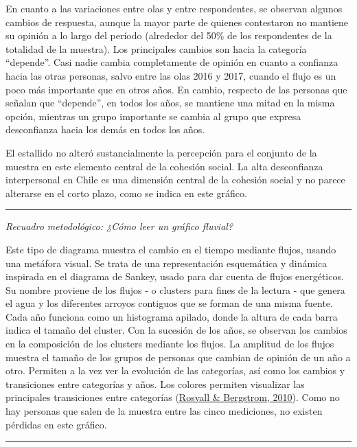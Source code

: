 \documentclass[
  12pt,
]{book}
\begin{document}
En cuanto a las variaciones entre olas y entre respondentes, se observan algunos cambios de respuesta, aunque la mayor parte de quienes contestaron no mantiene su opinión a lo largo del período (alrededor del 50\% de los respondentes de la totalidad de la muestra). Los principales cambios son hacia la categoría ``depende''. Casi nadie cambia completamente de opinión en cuanto a confianza hacia las otras personas, salvo entre las olas 2016 y 2017, cuando el flujo es un poco más importante que en otros años. En cambio, respecto de las personas que señalan que ``depende'', en todos los años, se mantiene una mitad en la misma opción, mientras un grupo importante se cambia al grupo que expresa desconfianza hacia los demás en todos los años.

El estallido no alteró sustancialmente la percepción para el conjunto de la muestra en este elemento central de la cohesión social. La alta desconfianza interpersonal en Chile es una dimensión central de la cohesión social y no parece alterarse en el corto plazo, como se indica en este gráfico.

\begin{center}\rule{0.5\linewidth}{0.5pt}\end{center}

\emph{Recuadro metodológico: ¿Cómo leer un gráfico fluvial?}

Este tipo de diagrama muestra el cambio en el tiempo mediante flujos, usando una metáfora visual. Se trata de una representación esquemática y dinámica inspirada en el diagrama de Sankey, usado para dar cuenta de flujos energéticos. Su nombre proviene de los flujos - o clusters para fines de la lectura - que genera el agua y los diferentes arroyos contiguos que se forman de una misma fuente. Cada año funciona como un histograma apilado, donde la altura de cada barra indica el tamaño del cluster. Con la sucesión de los años, se observan los cambios en la composición de los clusters mediante los flujos. La amplitud de los flujos muestra el tamaño de los grupos de personas que cambian de opinión de un año a otro. Permiten a la vez ver la evolución de las categorías, así como los cambios y transiciones entre categorías y años. Los colores permiten visualizar las principales transiciones entre categorías (\protect\hyperlink{ref-rosvall_mapping_2010}{Rosvall \& Bergstrom, 2010}). Como no hay personas que salen de la muestra entre las cinco mediciones, no existen pérdidas en este gráfico.

\begin{center}\rule{0.5\linewidth}{0.5pt}\end{center}
\end{document}
